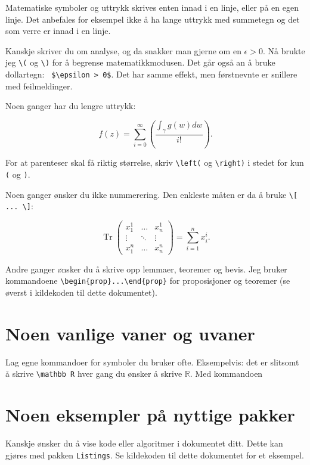\documentclass[11pt, a4paper]{article}
\DeclareMathOperator{\tr}{Tr}
\begin{document}
Matematiske symboler og uttrykk skrives enten innad i en linje, eller på en egen linje. Det anbefales for eksempel ikke å ha lange uttrykk med summetegn og det som verre er innad i en linje.

Kanskje skriver du om analyse, og da snakker man gjerne om en \(\epsilon > 0 \). Nå brukte jeg \verb|\(| og \verb|\)| for å begrense matematikkmodusen. Det går også an å bruke dollartegn: \verb| $\epsilon > 0$|. Det har samme effekt, men førstnevnte er snillere med feilmeldinger.

Noen ganger har du lengre uttrykk:

\begin{equation}
f(z) = \sum_{i=0}^\infty \left( 
\frac{\int_\gamma g(w) dw}{i!}
\right).
\end{equation}

For at parenteser skal få riktig størrelse, skriv \verb|\left(| og \verb|\right)| i stedet for kun \texttt{(} og \texttt{)}.

Noen ganger ønsker du ikke nummerering. Den enkleste måten er da å bruke \verb|\[ ... \]|:

\[
\tr \begin{pmatrix}
x_1^1 & \hdots & x_n^1 \\
\vdots & \ddots &  \vdots \\
x_1^n & \hdots & x_n^n
\end{pmatrix} = \sum_{i=1}^n x_i^i.
\]

Andre ganger ønsker du å skrive opp lemmaer, teoremer og bevis. Jeg bruker kommandoene \verb|\begin{prop}...\end{prop}| for proposisjoner og teoremer (se øverst i kildekoden til dette dokumentet). 

\section{Noen vanlige vaner og uvaner}

Lag egne kommandoer for symboler du bruker ofte. Eksempelvis: det er slitsomt å skrive \verb|\mathbb R| hver gang du ønsker å skrive $\mathbb R$. Med kommandoen 

\section{Noen eksempler på nyttige pakker}

Kanskje ønsker du å vise kode eller algoritmer i dokumentet ditt. Dette kan gjøres med pakken \texttt{Listings}. Se kildekoden til dette dokumentet for et eksempel. 
\end{document}
